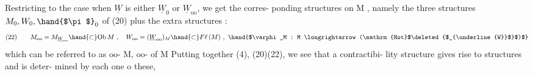 Restricting to the case when $\underline{W}$ is either $\underline{W}_{0}$ or $\underline{W}_{\mathrm{oo}}$, we get the corres-%
ponding structures on M , namely the three structures $M_0, W_0, \hand{$\pi$}_0$ of (20)
plus the  extra structures :
\[
(22) \qquad M_\mathrm{oo} = M_{\underline{W}_\mathrm{oo}} \hand{\subset} \mathrm{Ob}\,M \ , \quad W_\mathrm{oo} = (\underline{W}_\mathrm{oo})_M \hand{\subset} F\ell\,(M) \ , \ \hand{$\varphi_M : M \longrightarrow (\mathrm{Hot}$\deleted{$_{\underline{W}}$}$)$}
\]
which can be referred to as $\mathrm{oo}$-\hand{\uline{\textcolor{black}{connected}}} \hand{\uline{\textcolor{black}{objects}}} \hand{\uline{\textcolor{black}{of}}} M,  $\mathrm{oo}$-\hand{\uline{\textcolor{black}{connected}}}
\margin{$\times$} \hand{\uline{\textcolor{black}{arrows}}} of M  Putting together (4), (20)\hand{,}(22), we see that a contractibi-%
lity structure  gives rise to   structures  and is deter-%
mined by each one o these, 



